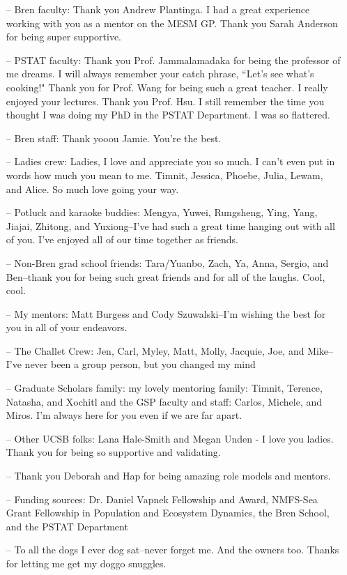 \begin{acknowledgements}
\begin{itemize}
\item[--] Bren faculty: Thank you Andrew Plantinga. I had a great experience working with you as a mentor on the MESM GP. Thank you Sarah Anderson for being super supportive. 
\item[--] PSTAT faculty: Thank you Prof. Jammalamadaka for being the professor of me dreams. I will always remember your catch phrase, ``Let's see what's cooking!" Thank you for Prof. Wang for being such a great teacher. I really enjoyed your lectures. Thank you Prof. Hsu. I still remember the time you thought I was doing my PhD in the PSTAT Department. I was so flattered. 
\item[--] Bren staff: Thank yooou Jamie. You're the best.
\item[--] Ladies crew: Ladies, I love and appreciate you so much. I can't even put in words how much you mean to me. Timnit, Jessica, Phoebe, Julia, Lewam, and Alice. So much love going your way.
\item[--] Potluck and karaoke buddies: Mengya, Yuwei, Rungsheng, Ying, Yang, Jiajai, Zhitong, and Yuxiong--I've had such a great time hanging out with all of you. I've enjoyed all of our time together as friends. 
\item[--] Non-Bren grad school friends: Tara/Yuanbo, Zach, Ya, Anna, Sergio, and Ben--thank you for being such great friends and for all of the laughs.  Cool, cool.
\item[--] My mentors: Matt Burgess and Cody Szuwalski--I'm wishing the best for you in all of your endeavors.
\item[--] The Challet Crew: Jen, Carl, Myley, Matt, Molly, Jacquie, Joe, and Mike--I've never been a group person, but you changed my mind
\item[--] Graduate Scholars family: my lovely mentoring family: Timnit, Terence, Natasha, and Xochitl and the GSP faculty and staff: Carlos, Michele, and Miros. I'm always here for you even if we are far apart.
\item[--] Other UCSB folks: Lana Hale-Smith and Megan Unden - I love you ladies. Thank you for being so supportive and validating.
\item[--] Thank you Deborah and Hap for being amazing role models and mentors.
\item[--] Funding sources: Dr. Daniel Vapnek Fellowship and Award, NMFS-Sea Grant Fellowship in Population and Ecosystem Dynamics, the Bren School, and the PSTAT Department
\item[--] To all the dogs I ever dog sat--never forget me. And the owners too. Thanks for letting me get my doggo snuggles.
\end{itemize}
\vspace{-\topsep}

\end{acknowledgements} 